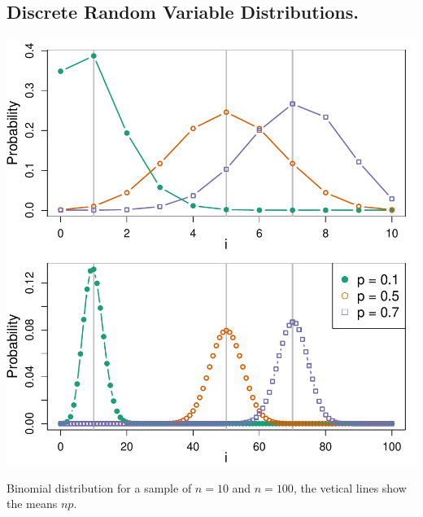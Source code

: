 
\subsection{Discrete Random Variable Distributions.}

 \begin{marginfigure}
 \begin{center}
   \includegraphics[width=\textwidth]{math_background/dist_pics/Binomial.pdf}\end{center}
 \caption{Binomial distribution for a sample of $n=10$ and $n=100$,
   the vetical lines show the means $np$. }\label{Fig:binomial}
 \end{marginfigure}

